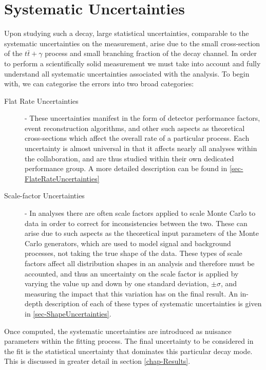 \chapter{Systematic Uncertainties} \label{chap-SystematicUncertainties}



Upon studying such a decay, large statistical uncertainties, comparable to the systematic uncertainties on the measurement, arise due to the small cross-section of the $t\bar{t}+\gamma$ process and small branching fraction of the decay channel. In order to perform a scientifically solid measurement we must take into account and fully understand all systematic uncertainties associated with the analysis. To begin with, we can categorise the errors into two broad categories:

\begin{description}
	\item[Flat Rate Uncertainties] - These uncertainties manifest in the form of detector performance factors, event reconstruction algorithms, and other such aspects as theoretical cross-sections which affect the overall rate of a particular process. Each uncertainty is almost universal in that it affects nearly all analyses within the collaboration, and are thus studied within their own dedicated performance group. A more detailed description can be found in \ref{sec-FlateRateUncertainties}  
	\item[Scale-factor Uncertainties] - In analyses there are often scale factors applied to scale Monte Carlo to data in order to correct for inconsistencies between the two. These can arise due to such aspects as the theoretical input parameters of the Monte Carlo generators, which are used to model signal and background processes, not taking the true shape of the data. These types of scale factors affect all distribution shapes in an analysis and therefore must be accounted, and thus an uncertainty on the scale factor is applied by varying the value up and down by one standard deviation, $\pm \sigma$, and measuring the impact that this variation has on the final result. An in-depth description of each of these types of systematic uncertainties is given in \ref{sec-ShapeUncertainties}.
\end{description}

Once computed, the systematic uncertainties are introduced as nuisance parameters within the fitting process. The final uncertainty to be considered in the fit is the statistical uncertainty that dominates this particular decay mode. This is discussed in greater detail in section \ref{chap-Results}.

